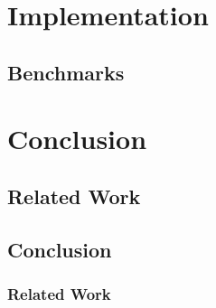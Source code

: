 \documentclass{vutinfth} %
\theoremstyle{example}
\theoremstyle{definition}
\theoremstyle{theorem}
\theoremstyle{lemma}
\theoremstyle{corollary}
\begin{document}



\chapter{Implementation}

\section{Benchmarks}

\chapter{Conclusion}

\section{Related Work}

\section{Conclusion}

\subsection{Related Work}

\backmatter

\listoffigures %

\listoftables %

\listofalgorithms
{}

\printindex

\printglossaries



\end{document}
